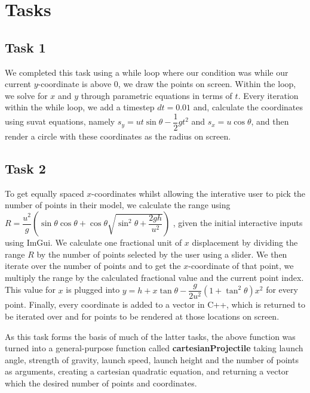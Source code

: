 \documentclass[main.tex]{subfiles}
\begin{document}
 
\section{Tasks}
\subsection{Task 1}
We completed this task using a while loop where our condition was while our current $y$-coordinate is above 0, we draw the points on screen. Within the loop, we solve for $x$ and $y$ through parametric equations in terms of $t$. Every iteration within the while loop, we add a timestep $dt = 0.01$ and, calculate the coordinates using suvat equations, namely $s_y = u t \sin\theta  - \dfrac{1}{2} g t^2$ and $s_x = u \cos\theta$, and then render a circle with these coordinates as the radius on screen.

\subsection{Task 2}
To get equally spaced $x$-coordinates whilst allowing the interative user to pick the number of points in their model, we calculate the range using $R = \dfrac{u^2}{g}\left(\sin\theta \cos\theta + \cos \theta \sqrt{\sin^2 \theta + \dfrac{2gh}{u^2}}\right)$ \cite{brief}, given the initial interactive inputs using ImGui. We calculate one fractional unit of $x$ displacement by dividing the range $R$ by the number of points selected by the user using a slider. We then iterate over the number of points and to get the $x$-coordinate of that point, we multiply the range by the calculated fractional value and the current point index. This value for $x$ is plugged into $y = h + x\tan\theta -\dfrac{g}{2u^2}\left(1+\tan^2\theta\right)x^2$ \cite{brief} for every point. Finally, every coordinate is added to a vector in C++, which is returned to be iterated over and for points to be rendered at those locations on screen.


\noindent As this task forms the basis of much of the latter tasks, the above function was turned into a general-purpose function called \textbf{cartesianProjectile} taking launch angle, strength of gravity, launch speed, launch height and the number of points as arguments, creating a cartesian quadratic equation, and returning a vector which the desired number of points and coordinates.
\end{document}
